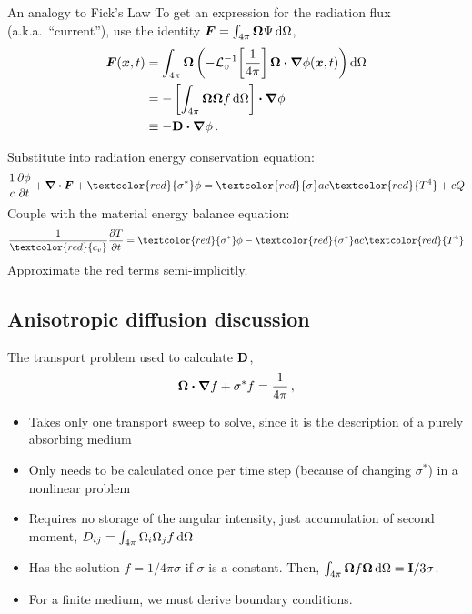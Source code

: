 \documentclass{beamer}
\begin{document}
\begin{frame}{An analogy to Fick's Law}
  To get an expression for the radiation flux (a.k.a.~``current''), use the identity
  $\bm{F} = \int_{4\pi}\bm{\Omega} \Psi \mathop{}\!\mathrm{d}\Omega$,
  \begin{align*}
    \bm{F}(\bm{x}, t)
    &= \int_{4\pi}\bm{\Omega} \left( - \mathcal{L}_{v}^{-1}\!\left[
    \frac1{4\pi} \right] \bm{\Omega}\bm{\cdot} \bm{\nabla} \phi(\bm{x},t) \right)
    \mathop{}\!\mathrm{d}\Omega
    \\
      &= - \left[ \int_{4\pi}\bm{\Omega}\bm{\Omega} f \mathop{}\!\mathrm{d}\Omega\right] \bm{\cdot} \bm{\nabla} \phi
    \\
      &\equiv -\mathbf{D} \bm{\cdot} \bm{\nabla} \phi \,.
  \end{align*}

  Substitute into radiation energy conservation equation:
\begin{equation*}
  \frac{1}{c} \pder{\phi}{t}
  + \del \vd \vec{F} + \textcolor{red}{\sigma^*} \phi
  = \textcolor{red}{\sigma} ac\textcolor{red}{T^4}
  + c Q
\end{equation*}
Couple with the material energy balance equation:
\begin{equation*}
  \frac{1}{\textcolor{red}{c_v}}\pder{T}{t} = \textcolor{red}{\sigma^*} \phi -
  \textcolor{red}{\sigma^*} ac\textcolor{red}{T^4}
\end{equation*}
Approximate the red terms semi-implicitly.

\end{frame}

\subsection{Anisotropic diffusion discussion}
\begin{frame}
  The transport problem used to calculate $\mathbf{D}$,
  \begin{equation*}
    \bm{\Omega}\bm{\cdot} \bm{\nabla} f + \sigma^* f = \frac{1}{4\pi} \,,
  \end{equation*}
  \vspace{-\baselineskip}
  \begin{itemize}
    \item Takes only one transport sweep to solve, since it is the description
      of a purely absorbing medium
    \item Only needs to be calculated once per time step (because of changing
      $\sigma^*$) in a nonlinear problem \item Requires no storage of the
      angular intensity, just accumulation of second moment, $D_{ij} =
      \int_{4\pi} \Omega_i \Omega_j f \mathop{}\!\mathrm{d}\Omega$
    \item Has the solution $f=1/4\pi\sigma$ if $\sigma$ is a constant.
      Then, $\int_{4\pi} \bm{\Omega} f \bm{\Omega} \mathop{}\!\mathrm{d}\Omega =
      \mathbf{I}/3\sigma$.
    \item For a finite medium, we must derive boundary conditions.
  \end{itemize}
\end{frame}
\end{document}
